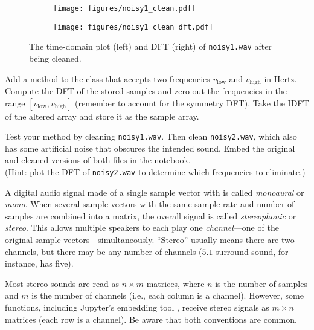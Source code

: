 \begin{figure}[H]
\captionsetup[subfigure]{justification=centering}
\centering
\begin{subfigure}{.53\textwidth}
    \centering
    \texttt{[image: figures/noisy1\_clean.pdf]}
\end{subfigure}%
\begin{subfigure}{.47\textwidth}
    \centering
    \texttt{[image: figures/noisy1\_clean\_dft.pdf]}
\end{subfigure}
\caption{The time-domain plot (left) and DFT (right) of \texttt{noisy1.wav} after being cleaned.}
\label{fig:fft-noisy-cleaned}
\end{figure}

\begin{problem} %
\label{prob:fft-filter-frequencies}
Add a method to the  class that accepts two frequencies $v_\text{low}$ and $v_\text{high}$ in Hertz.
Compute the DFT of the stored samples and zero out the frequencies in the range $[v_\text{low}, v_\text{high}]$ (remember to account for the symmetry DFT).
Take the IDFT of the altered array and store it as the sample array.

Test your method by cleaning \texttt{noisy1.wav}. 
Then clean \texttt{noisy2.wav}, which also has some artificial noise that obscures the intended sound.
Embed the original and cleaned versions of both files in the notebook. 
\\(Hint: plot the DFT of \texttt{noisy2.wav} to determine which frequencies to eliminate.)
\end{problem}

A digital audio signal made of a single sample vector with is called \emph{monoaural} or \emph{mono}.
When several sample vectors with the same sample rate and number of samples are combined into a matrix, the overall signal is called \emph{stereophonic} or \emph{stereo}.
This allows multiple speakers to each play one \emph{channel}---one of the original sample vectors---simultaneously.
``Stereo'' usually means there are two channels, but there may be any number of channels ($5.1$ surround sound, for instance, has five).

Most stereo sounds are read as $n\times m$ matrices, where $n$ is the number of samples and $m$ is the number of channels (i.e., each column is a channel).
However, some functions, including Jupyter's embedding tool , receive stereo signals as $m\times n$ matrices (each row is a channel).
Be aware that both conventions are common.

